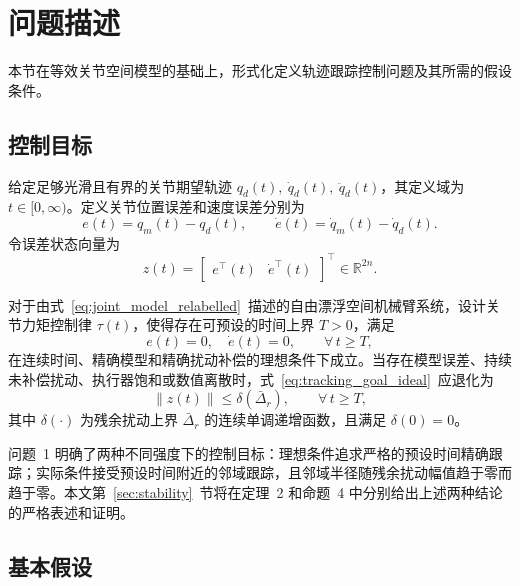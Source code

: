 \section{问题描述}
\label{sec:problem}

本节在等效关节空间模型的基础上，形式化定义轨迹跟踪控制问题及其所需的假设条件。

\subsection{控制目标}

给定足够光滑且有界的关节期望轨迹 \(q_d(t),\ \dot q_d(t),\ \ddot q_d(t)\)，其定义域为 \(t\in[0,\infty)\)。定义关节位置误差和速度误差分别为
\begin{equation}
e(t) = q_m(t) - q_d(t),\qquad
\dot e(t) = \dot q_m(t) - \dot q_d(t).
\label{eq:tracking_errors}
\end{equation}
令误差状态向量为
\begin{equation}
z(t) = \begin{bmatrix} e^\top(t) & \dot e^\top(t) \end{bmatrix}^\top \in \mathbb R^{2n}.
\label{eq:error_state}
\end{equation}

\begin{problem}[预设时间关节轨迹跟踪]\label{prob:tracking}
  对于由式~\eqref{eq:joint_model_relabelled}~描述的自由漂浮空间机械臂系统，设计关节力矩控制律 \(\tau(t)\)，使得存在可预设的时间上界 \(T>0\)，满足
  \begin{equation}
  e(t) = 0,\quad \dot e(t) = 0,\qquad \forall\,t \ge T,
  \label{eq:tracking_goal_ideal}
  \end{equation}
  在连续时间、精确模型和精确扰动补偿的理想条件下成立。当存在模型误差、持续未补偿扰动、执行器饱和或数值离散时，式~\eqref{eq:tracking_goal_ideal}~应退化为
  \begin{equation}
  \|z(t)\| \le \delta(\bar\Delta_r),\qquad \forall\,t\ge T,
  \label{eq:tracking_goal_practical}
  \end{equation}
  其中 \(\delta(\cdot)\) 为残余扰动上界 \(\bar\Delta_r\) 的连续单调递增函数，且满足 \(\delta(0)=0\)。
\end{problem}

问题~1 明确了两种不同强度下的控制目标：理想条件追求严格的预设时间精确跟踪；实际条件接受预设时间附近的邻域跟踪，且邻域半径随残余扰动幅值趋于零而趋于零。本文第~\ref{sec:stability}~节将在定理~2 和命题~4 中分别给出上述两种结论的严格表述和证明。

\subsection{基本假设}

